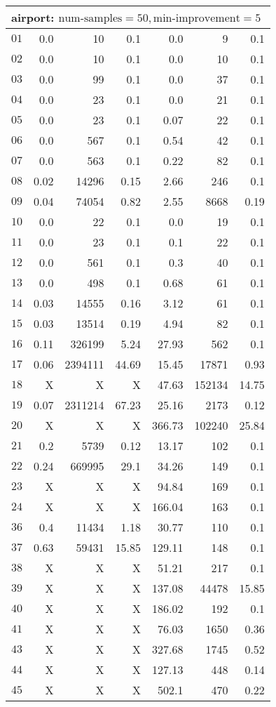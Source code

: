 \begin{longtable}{|c||r|r|r||r|r|r|}
\multicolumn{7}{|l|}{airport: $\text{num-samples}=50,\text{min-improvement}=5$}\\\hline
$01$ & 0.0 & 10 & 0.1 &0.0 & 9 & 0.1 \\\hline
$02$ & 0.0 & 10 & 0.1 &0.0 & 10 & 0.1 \\\hline
$03$ & 0.0 & 99 & 0.1 &0.0 & 37 & 0.1 \\\hline
$04$ & 0.0 & 23 & 0.1 &0.0 & 21 & 0.1 \\\hline
$05$ & 0.0 & 23 & 0.1 &0.07 & 22 & 0.1 \\\hline
$06$ & 0.0 & 567 & 0.1 &0.54 & 42 & 0.1 \\\hline
$07$ & 0.0 & 563 & 0.1 &0.22 & 82 & 0.1 \\\hline
$08$ & 0.02 & 14296 & 0.15 &2.66 & 246 & 0.1 \\\hline
$09$ & 0.04 & 74054 & 0.82 &2.55 & 8668 & 0.19 \\\hline
$10$ & 0.0 & 22 & 0.1 &0.0 & 19 & 0.1 \\\hline
$11$ & 0.0 & 23 & 0.1 &0.1 & 22 & 0.1 \\\hline
$12$ & 0.0 & 561 & 0.1 &0.3 & 40 & 0.1 \\\hline
$13$ & 0.0 & 498 & 0.1 &0.68 & 61 & 0.1 \\\hline
$14$ & 0.03 & 14555 & 0.16 &3.12 & 61 & 0.1 \\\hline
$15$ & 0.03 & 13514 & 0.19 &4.94 & 82 & 0.1 \\\hline
$16$ & 0.11 & 326199 & 5.24 &27.93 & 562 & 0.1 \\\hline
$17$ & 0.06 & 2394111 & 44.69 &15.45 & 17871 & 0.93 \\\hline
$18$ & X & X & X &47.63 & 152134 & 14.75 \\\hline
$19$ & 0.07 & 2311214 & 67.23 &25.16 & 2173 & 0.12 \\\hline
$20$ & X & X & X &366.73 & 102240 & 25.84 \\\hline
$21$ & 0.2 & 5739 & 0.12 &13.17 & 102 & 0.1 \\\hline
$22$ & 0.24 & 669995 & 29.1 &34.26 & 149 & 0.1 \\\hline
$23$ & X & X & X &94.84 & 169 & 0.1 \\\hline
$24$ & X & X & X &166.04 & 163 & 0.1 \\\hline
$36$ & 0.4 & 11434 & 1.18 &30.77 & 110 & 0.1 \\\hline
$37$ & 0.63 & 59431 & 15.85 &129.11 & 148 & 0.1 \\\hline
$38$ & X & X & X &51.21 & 217 & 0.1 \\\hline
$39$ & X & X & X &137.08 & 44478 & 15.85 \\\hline
$40$ & X & X & X &186.02 & 192 & 0.1 \\\hline
$41$ & X & X & X &76.03 & 1650 & 0.36 \\\hline
$43$ & X & X & X &327.68 & 1745 & 0.52 \\\hline
$44$ & X & X & X &127.13 & 448 & 0.14 \\\hline
$45$ & X & X & X &502.1 & 470 & 0.22 \\\hline


\end{longtable}
